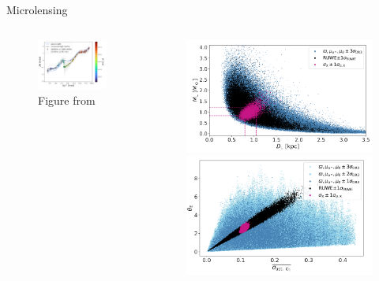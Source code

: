\documentclass[hyperref={colorlinks = true, linkcolor=blue},8pt]{beamer}
\begin{document}
\begin{frame}{Microlensing}
\begin{columns}
\begin{column}{0.5\columnwidth}
		\begin{figure}
			\includegraphics[width=\columnwidth]{microlensingpath.png}
			\caption{Figure from \cite{jablonskaThere2022}}
		\end{figure}
\end{column}
\begin{column}{0.5\columnwidth}
		\begin{figure}
			\includegraphics[width=\columnwidth]{microlensingsimMD.png}
			\includegraphics[width=\columnwidth]{microlensingsimTheta.png}

\end{figure}
\end{column}
\end{columns}
\end{frame}
\end{document}
